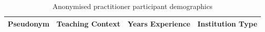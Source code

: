 \begin{table}[htbp]
\centering
\caption{Anonymised practitioner participant demographics}
\label{tab:participant_demographics}
\begin{tabular}{llll}
\toprule
Pseudonym & Teaching Context & Years Experience & Institution Type \\
\midrule
\bottomrule
\end{tabular}
\end{table}
